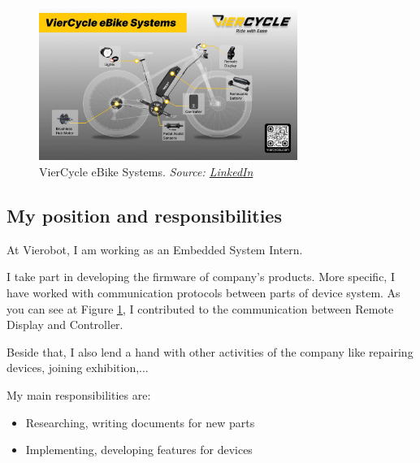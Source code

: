 \begin{figure}[H]
	\centering
	\includegraphics[width = 0.75\textwidth]{images/viercycle_ebike_systems.jpeg}
	\caption{VierCycle eBike Systems. \textit{Source: \href{https://www.linkedin.com/posts/viercycle_viercycle-ridewithease-emobility-activity-7121323454666088448-dchL?utm_source=share&utm_medium=member_desktop}{LinkedIn}}}
	\label{fig: viercycle_ebike_systems}
\end{figure}

\subsection{My position and responsibilities}

At Vierobot, I am working as an Embedded System Intern.

I take part in developing the firmware of company's products. More specific, I have worked with communication protocols between parts of device system. As you can see at Figure \ref{fig: viercycle_ebike_systems}, I contributed to the communication between Remote Display and Controller.

Beside that, I also lend a hand with other activities of the company like repairing devices, joining exhibition,...

My main responsibilities are:

\begin{itemize}
	\item {Researching, writing documents for new parts}
	\item {Implementing, developing features for devices}
\end{itemize}

